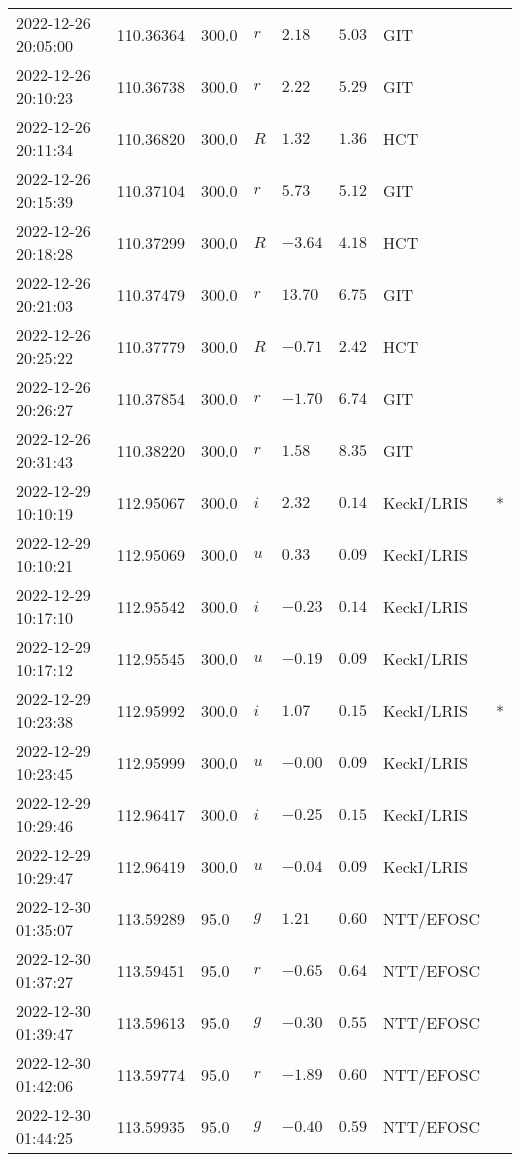 \documentclass{nature_plusfigure}
\begin{document}
\begin{supplement}
\begin{center}
\begin{longtable}{llllllll}
2022-12-26 20:05:00 & 110.36364 & 300.0 & $r$ & $2.18$ & $5.03$ & GIT &  \\ 
2022-12-26 20:10:23 & 110.36738 & 300.0 & $r$ & $2.22$ & $5.29$ & GIT &  \\ 
2022-12-26 20:11:34 & 110.36820 & 300.0 & $R$ & $1.32$ & $1.36$ & HCT &  \\ 
2022-12-26 20:15:39 & 110.37104 & 300.0 & $r$ & $5.73$ & $5.12$ & GIT &  \\ 
2022-12-26 20:18:28 & 110.37299 & 300.0 & $R$ & $-3.64$ & $4.18$ & HCT &  \\ 
2022-12-26 20:21:03 & 110.37479 & 300.0 & $r$ & $13.70$ & $6.75$ & GIT &  \\ 
2022-12-26 20:25:22 & 110.37779 & 300.0 & $R$ & $-0.71$ & $2.42$ & HCT &  \\ 
2022-12-26 20:26:27 & 110.37854 & 300.0 & $r$ & $-1.70$ & $6.74$ & GIT &  \\ 
2022-12-26 20:31:43 & 110.38220 & 300.0 & $r$ & $1.58$ & $8.35$ & GIT &  \\ 
2022-12-29 10:10:19 & 112.95067 & 300.0 & $i$ & $2.32$ & $0.14$ & KeckI/LRIS & * \\ 
2022-12-29 10:10:21 & 112.95069 & 300.0 & $u$ & $0.33$ & $0.09$ & KeckI/LRIS &  \\ 
2022-12-29 10:17:10 & 112.95542 & 300.0 & $i$ & $-0.23$ & $0.14$ & KeckI/LRIS &  \\ 
2022-12-29 10:17:12 & 112.95545 & 300.0 & $u$ & $-0.19$ & $0.09$ & KeckI/LRIS &  \\ 
2022-12-29 10:23:38 & 112.95992 & 300.0 & $i$ & $1.07$ & $0.15$ & KeckI/LRIS & * \\ 
2022-12-29 10:23:45 & 112.95999 & 300.0 & $u$ & $-0.00$ & $0.09$ & KeckI/LRIS &  \\ 
2022-12-29 10:29:46 & 112.96417 & 300.0 & $i$ & $-0.25$ & $0.15$ & KeckI/LRIS &  \\ 
2022-12-29 10:29:47 & 112.96419 & 300.0 & $u$ & $-0.04$ & $0.09$ & KeckI/LRIS &  \\ 
2022-12-30 01:35:07 & 113.59289 & 95.0 & $g$ & $1.21$ & $0.60$ & NTT/EFOSC &  \\ 
2022-12-30 01:37:27 & 113.59451 & 95.0 & $r$ & $-0.65$ & $0.64$ & NTT/EFOSC &  \\ 
2022-12-30 01:39:47 & 113.59613 & 95.0 & $g$ & $-0.30$ & $0.55$ & NTT/EFOSC &  \\ 
2022-12-30 01:42:06 & 113.59774 & 95.0 & $r$ & $-1.89$ & $0.60$ & NTT/EFOSC &  \\ 
2022-12-30 01:44:25 & 113.59935 & 95.0 & $g$ & $-0.40$ & $0.59$ & NTT/EFOSC &  \\ 

\end{longtable}
\end{center}
\end{supplement}
\end{document}
